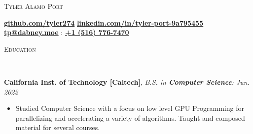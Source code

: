 \documentclass[9pt]{article}
\newenvironment{changemargin}[2]{%
  \begin{list}{}{%
    \setlength{\topsep}{0pt}%
    \setlength{\leftmargin}{#1}%
    \setlength{\rightmargin}{#2}%
    \setlength{\listparindent}{\parindent}%
    \setlength{\itemindent}{\parindent}%
    \setlength{\parsep}{\parskip}%
  }%
  \item[]}{\end{list}
}
\newcommand{\lineover}{
	\begin{changemargin}{-0.05in}{-0.05in}
		\vspace*{-8pt}
		\hrulefill \\
		\vspace*{-2pt}
	\end{changemargin}
}
\newcommand{\header}[1]{
	\begin{changemargin}{-0.5in}{-0.5in}
		\scshape{#1}\\
  	\lineover
	\end{changemargin}
}
\newenvironment{body} {
	\vspace*{-16pt}
	\begin{changemargin}{-0.25in}{-0.5in}
  }	
	{\end{changemargin}
}
\begin{document}
\begin{center}
	{\Large \scshape Tyler Alamo Port}
\end{center}
\vspace*{-2pt}
\hspace{7.25mm} \faGithub \hspace{0.25mm} \textbf{\href{https://github.com/tyler274}{github.com/tyler274}} \hspace{7.25mm} \faLinkedinSquare \hspace{0.25mm} \textbf{\href{https://linkedin.com/in/tyler-port-9a795455/}{linkedin.com/in/tyler-port-9a795455}} \\
\vspace*{3pt}  \hspace{12.25mm} \faEnvelope \hspace{0.1mm} \textbf{\href{mailto:tp@dabney.moe}{tp@dabney.moe}} \hspace{8.25mm} \faMobile : \textbf{\href{tel:+15167767470}{+1 (516) 776-7470}}\\
\vspace{1pt}
\smallskip

\header{Education}
\begin{body}
	\vspace{16pt}
	\textbf{California Inst. of Technology [Caltech]}{}, \emph{B.S. in
	\textbf{Computer Science}:} \hfill \emph{Jun. 2022}{} \\
	\vspace{-3pt}
	\begin{itemize} \itemsep -0pt
		\item Studied Computer Science with a focus on low level GPU Programming for
		parallelizing and accelerating a variety of algorithms. Taught and composed material for
		several courses.
	\end{itemize}
\end{body}

\smallskip
\vspace*{-3pt}
\end{document}

